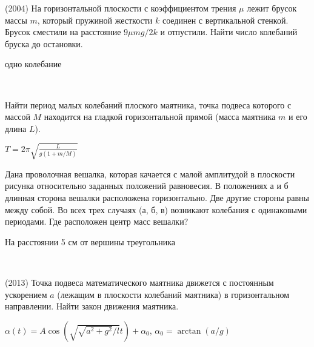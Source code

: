 \begin{ex}
(2004) На горизонтальной плоскости с коэффициентом трения $\mu$ лежит брусок массы $m$, который пружиной жесткости $k$ соединен с вертикальной стенкой. Брусок сместили на расстояние $9\mu mg /2k$ и отпустили. Найти число колебаний бруска до остановки.
\begin{ans}
одно колебание
\end{ans}
\end{ex}

\begin{ex}
\hspace{0pt} \\
\begin{minipage}{.65\textwidth} 
Найти период малых колебаний плоского маятника, точка подвеса которого с массой $M$ находится на гладкой горизонтальной прямой 
(масса маятника $m$ и его длина $L$).
\end{minipage}
\begin{minipage}{.35\textwidth}
\centering

\end{minipage}
\begin{ans}
$T=2\pi \sqrt{\frac{L}{g(1+m/M)}}$
\end{ans}
\end{ex}

\begin{ex}
Дана проволочная вешалка, которая качается с малой амплитудой в плоскости рисунка относительно заданных положений равновесия. 
В положениях а и б длинная сторона вешалки расположена горизонтально. Две другие стороны равны между собой. 
Во всех трех случаях (а, б, в) возникают колебания с одинаковыми периодами. Где расположен центр масс вешалки?
\begin{center}

\end{center}
\begin{ans}
На расстоянии 5 см от вершины треугольника
\end{ans}
\end{ex}

\begin{ex}
\hspace{0pt} \\
\begin{minipage}{.65\textwidth}
(2013) Точка подвеса математического маятника движется с постоянным ускорением $a$ (лежащим в плоскости колебаний маятника) в горизонтальном направлении. Найти закон движения маятника.
\end{minipage}
\begin{minipage}{.35\textwidth}
\centering

\end{minipage}
\begin{ans}
$\alpha(t) = A \cos(\sqrt{\sqrt{a^2+g^2}/l}t) + \alpha_0$, $\alpha_0 = \arctan(a/g)$
\end{ans}
\end{ex}

